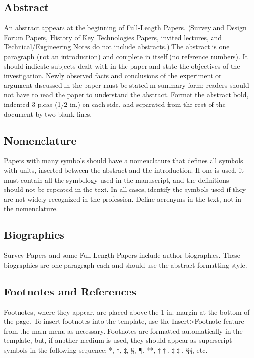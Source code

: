 \documentclass{AIAA}
\begin{document}
\subsection{Abstract}
An abstract appears at the beginning of Full-Length Papers. (Survey and Design Forum Papers, History of Key Technologies Papers, invited lectures, and Technical/Engineering Notes do not include abstracts.) The abstract is one paragraph (not an introduction) and complete in itself (no reference numbers). It should indicate subjects dealt with in the paper and state the objectives of the investigation. Newly observed facts and conclusions of the experiment or argument discussed in the paper must be stated in summary form; readers should not have to read the paper to understand the abstract. Format the abstract bold, indented 3 picas (1/2 in.) on each side, and separated from the rest of the document by two blank lines.

\subsection{Nomenclature}
Papers with many symbols should have a nomenclature that defines all symbols with units, inserted between the abstract and the introduction. If one is used, it must contain all the symbology used in the manuscript, and the definitions should not be repeated in the text. In all cases, identify the symbols used if they are not widely recognized in the profession. Define acronyms in the text, not in the nomenclature.

\subsection{Biographies}
Survey Papers and some Full-Length Papers include author biographies. These biographies are one paragraph each and should use the abstract formatting style.

\subsection{Footnotes and References}
Footnotes, where they appear, are placed above the 1-in. margin at the bottom of the page. To insert footnotes into the template, use the Insert>Footnote feature from the main menu as necessary. Footnotes are formatted automatically in the template, but, if another medium is used, they should appear as superscript symbols in the following sequence: *, $\dag $, $\ddag $, \S , \P , **, $\dag \dag $, $\ddag \ddag $, \S \S , etc.
\end{document}
